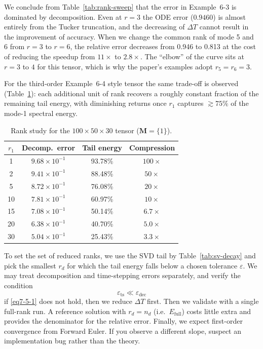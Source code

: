 \documentclass[11pt, oneside]{article}  %
\newcommand{\varp}{\varepsilon}
\newcommand{\caM}{\mathbf{M}}
\newcommand{\beq}{\begin{equation}}
\newcommand{\eeq}{\end{equation}}
\begin{document}
We conclude from Table~\ref{tab:rank-sweep} that the error in Example~6-3 is dominated by decomposition. Even at $r=3$ the ODE error 
($0.9460$) is almost entirely from the Tucker truncation, and the decreasing of $\Delta T$ cannot result in the improvement of accuracy. When we 
change the common rank of mode 5 and 6 from $r=3$ to $r=6$, the relative error decreases from 0.946 to 0.813 at the cost of reducing the speedup 
from $11\times$ to $2.8\times$.  The ``elbow'' of the curve sits at $r=3$ to $4$ for this tensor, which is why the
paper's examples adopt $r_5=r_6=3$.

For the third-order Example~6-4 style tensor the same trade-off is observed (Table~\ref{tab:rank-sweep-3rd}): each additional unit of rank recovers 
a roughly constant fraction of the remaining tail energy, with diminishing returns once $r_1$ captures $\gtrsim 75\%$ of the mode-1 spectral energy.

\begin{table}[h]
\centering
\caption{Rank study for the $100\times 50\times 30$ tensor
($\caM=\{1\}$).}
\label{tab:rank-sweep-3rd}
\begin{tabular}{c|cc|c}
\hline
$r_1$ & Decomp.\ error & Tail energy & Compression \\
\hline
 1 & $9.68\times 10^{-1}$ & 93.78\% & $100\times$ \\
 2 & $9.41\times 10^{-1}$ & 88.48\% &  $50\times$ \\
 5 & $8.72\times 10^{-1}$ & 76.08\% &  $20\times$ \\
10 & $7.81\times 10^{-1}$ & 60.97\% &  $10\times$ \\
15 & $7.08\times 10^{-1}$ & 50.14\% &  $6.7\times$ \\
20 & $6.38\times 10^{-1}$ & 40.70\% &  $5.0\times$ \\
30 & $5.04\times 10^{-1}$ & 25.43\% &  $3.3\times$ \\
\hline
\end{tabular}
\end{table}

To set the set of reduced ranks, we use the SVD tail by Table~\ref{tab:sv-decay} and pick the smallest $r_d$ for which the tail energy falls below 
a chosen tolerance $\varp$. We may treat decomposition and time-stepping errors separately, and verify the condition 
\beq\label{eq7-5-1}
\varp_{\text{ts}}\ll\varp_{\text{dec}}
\eeq 
if \eqref{eq7-5-1} does not hold, then we reduce $\Delta T$ first.  Then we validate with a single full-rank run.  A reference solution with 
$r_d=n_d$ (i.e.\ $E_{\text{full}}$) costs little extra and provides the denominator for the relative error.  Finally, we expect first-order convergence 
from Forward Euler. If you observe a different slope, suspect an implementation bug rather than the theory.
\end{document}

